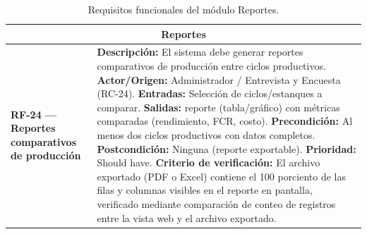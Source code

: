 \documentclass[11pt,a4paper]{article}
\begin{document}
\begin{longtable}{|p{3.5cm}|p{12cm}|}
\caption{Requisitos funcionales del módulo Reportes.}
\label{tab:rf-reportes} \\
\hline

\multicolumn{2}{|c|}{\textbf{Reportes}} \\ \hline

\textbf{RF-24 — Reportes comparativos de producción} &
\textbf{Descripción:} El sistema debe generar reportes comparativos de producción entre ciclos productivos. \newline
\textbf{Actor/Origen:} Administrador / Entrevista y Encuesta (RC-24). \newline
\textbf{Entradas:} Selección de ciclos/estanques a comparar. \newline
\textbf{Salidas:} reporte (tabla/gráfico) con métricas comparadas (rendimiento, FCR, costo). \newline
\textbf{Precondición:} Al menos dos ciclos productivos con datos completos. \newline
\textbf{Postcondición:} Ninguna (reporte exportable). \newline
\textbf{Prioridad:} Should have. \newline
\textbf{Criterio de verificación:} El archivo exportado (PDF o Excel) contiene el 100 porciento de las filas y columnas visibles en el reporte en pantalla, verificado mediante comparación de conteo de registros entre la vista web y el archivo exportado. \\ \hline

\end{longtable}
\newpage
\end{document}
